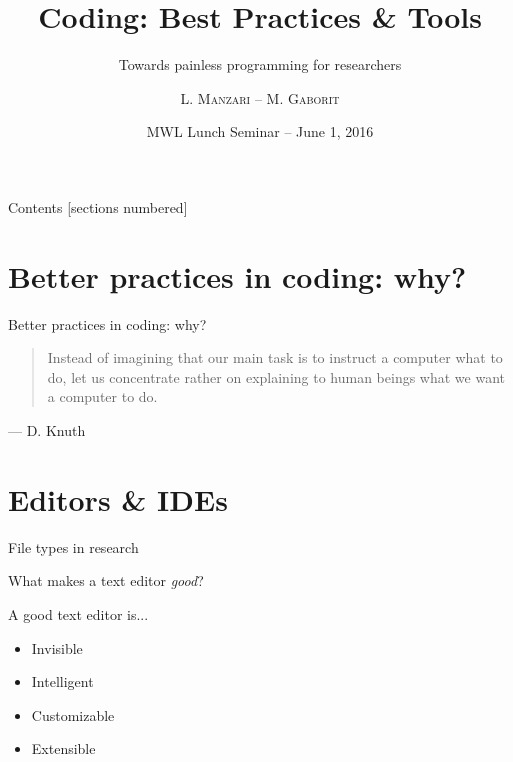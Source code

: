 \documentclass[10pt]{beamer}
\title{Coding: Best Practices \& Tools}
\subtitle{Towards painless programming for researchers}
\author{L. \textsc{Manzari} -- M. \textsc{Gaborit}}
\date{MWL Lunch Seminar -- June 1, 2016}
\institute{}
\newcommand\fileimage[1]{%
	\draw[fill=black!2] (#1) -- ++(2,0) -- ++(0,2.5) -- ++(-1.5,0) -- ++(-.5,-.5) -- cycle;
}
\begin{document}
\maketitle

\begin{frame}{Contents}
	[sections numbered]
	\tableofcontents[hideallsubsections]
\end{frame}

\section{Better practices in coding: why?} %

\begin{frame}{Better practices in coding: why?}

	\begin{quotation}
		Instead of imagining that our main task is to instruct a
		computer what to do, let us concentrate rather on explaining to human
		beings what we want a computer to do.
	\end{quotation}
	\begin{flushright}
		--- D. Knuth
	\end{flushright}

\end{frame}

\section{Editors \& IDEs} %

\begin{frame}{File types in research} %

	\begin{center}
		\pause{}


	\end{center}
\end{frame}

\begin{frame}{What makes a text editor \emph{good}?} %

	A good text editor is...
	\large
		\begin{itemize}
			\item Invisible
			\item Intelligent
			\item Customizable
			\item Extensible
		\end{itemize}

\end{frame}
\end{document}
